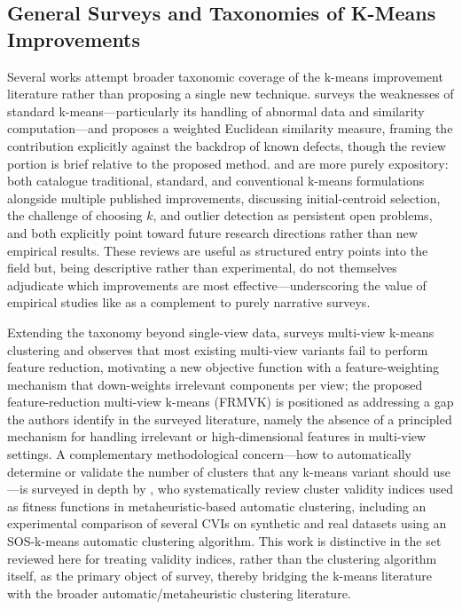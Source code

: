\subsection{General Surveys and Taxonomies of K-Means Improvements}
Several works attempt broader taxonomic coverage of the k-means improvement literature rather than proposing a single new technique. \cite{zhao2021means} surveys the weaknesses of standard k-means---particularly its handling of abnormal data and similarity computation---and proposes a weighted Euclidean similarity measure, framing the contribution explicitly against the backdrop of known defects, though the review portion is brief relative to the proposed method. \cite{chong2021means} and \cite{oti2021comprehensive} are more purely expository: both catalogue traditional, standard, and conventional k-means formulations alongside multiple published improvements, discussing initial-centroid selection, the challenge of choosing $k$, and outlier detection as persistent open problems, and both explicitly point toward future research directions rather than new empirical results. These reviews are useful as structured entry points into the field but, being descriptive rather than experimental, do not themselves adjudicate which improvements are most effective---underscoring the value of empirical studies like \cite{franti2019how} as a complement to purely narrative surveys.

Extending the taxonomy beyond single-view data, \cite{yang2019feature} surveys multi-view k-means clustering and observes that most existing multi-view variants fail to perform feature reduction, motivating a new objective function with a feature-weighting mechanism that down-weights irrelevant components per view; the proposed feature-reduction multi-view k-means (FRMVK) is positioned as addressing a gap the authors identify in the surveyed literature, namely the absence of a principled mechanism for handling irrelevant or high-dimensional features in multi-view settings. A complementary methodological concern---how to automatically determine or validate the number of clusters that any k-means variant should use---is surveyed in depth by \cite{ikotun2025cluster}, who systematically review cluster validity indices used as fitness functions in metaheuristic-based automatic clustering, including an experimental comparison of several CVIs on synthetic and real datasets using an SOS-k-means automatic clustering algorithm. This work is distinctive in the set reviewed here for treating validity indices, rather than the clustering algorithm itself, as the primary object of survey, thereby bridging the k-means literature with the broader automatic/metaheuristic clustering literature.

